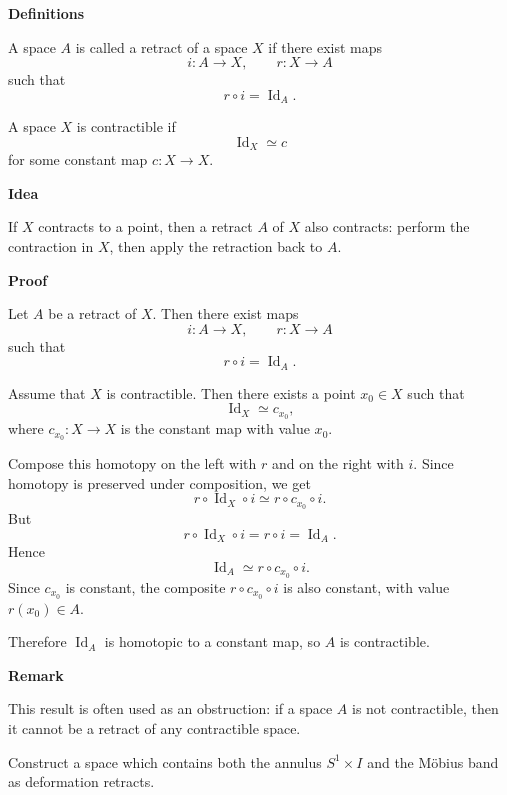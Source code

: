 \begin{solution}

\medskip
\noindent\textbf{Definitions}\par
\smallskip


A space \(A\) is called a retract of a space \(X\) if there exist maps
\[
i:A\to X,
\qquad
r:X\to A
\]
such that
\[
r\circ i = \operatorname{Id}_A.
\]

A space \(X\) is contractible if
\[
\operatorname{Id}_X \simeq c
\]
for some constant map \(c:X\to X\).


\medskip
\noindent\textbf{Idea}\par
\smallskip


If \(X\) contracts to a point, then a retract \(A\) of \(X\) also contracts: perform the contraction in \(X\), then apply the retraction back to \(A\).


\medskip
\noindent\textbf{Proof}\par
\smallskip


Let \(A\) be a retract of \(X\). Then there exist maps
\[
i:A\to X,
\qquad
r:X\to A
\]
such that
\[
r\circ i = \operatorname{Id}_A.
\]

Assume that \(X\) is contractible. Then there exists a point \(x_0\in X\) such that
\[
\operatorname{Id}_X \simeq c_{x_0},
\]
where \(c_{x_0}:X\to X\) is the constant map with value \(x_0\).

Compose this homotopy on the left with \(r\) and on the right with \(i\). Since homotopy is preserved under composition, we get
\[
r\circ \operatorname{Id}_X \circ i \simeq r\circ c_{x_0}\circ i.
\]
But
\[
r\circ \operatorname{Id}_X \circ i = r\circ i = \operatorname{Id}_A.
\]
Hence
\[
\operatorname{Id}_A \simeq r\circ c_{x_0}\circ i.
\]
Since \(c_{x_0}\) is constant, the composite \(r\circ c_{x_0}\circ i\) is also constant, with value \(r(x_0)\in A\).

Therefore \(\operatorname{Id}_A\) is homotopic to a constant map, so \(A\) is contractible.


\medskip
\noindent\textbf{Remark}\par
\smallskip


This result is often used as an obstruction: if a space \(A\) is not contractible, then it cannot be a retract of any contractible space.
\end{solution}

\begin{problem}
Construct a space which contains both the annulus \(S^1\times I\) and the Möbius band as deformation retracts.
\end{problem}

